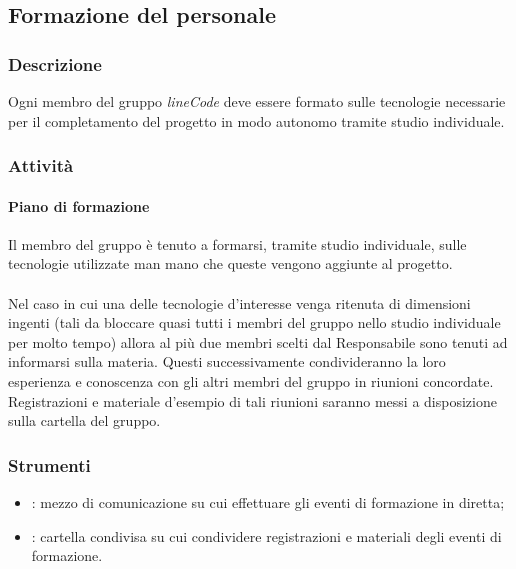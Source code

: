 \subsection{Formazione del personale}

	\subsubsection{Descrizione}
	Ogni membro del gruppo \textit{lineCode} deve essere formato sulle tecnologie necessarie per il completamento del progetto in modo autonomo tramite studio individuale.

    \subsubsection{Attività}
        \paragraph{Piano di formazione}
        Il membro del gruppo è tenuto a formarsi, tramite studio individuale, sulle tecnologie utilizzate man mano che queste vengono aggiunte al progetto.
        \\\\
        Nel caso in cui una delle tecnologie d'interesse venga ritenuta di dimensioni ingenti (tali da bloccare quasi tutti i membri del gruppo nello studio individuale per molto tempo) allora al più due membri scelti dal Responsabile sono tenuti ad informarsi sulla materia. Questi successivamente condivideranno la loro esperienza e conoscenza con gli altri membri del gruppo in riunioni concordate. Registrazioni e materiale d'esempio di tali riunioni saranno messi a disposizione sulla cartella  del gruppo.

    \subsubsection{Strumenti}
    \begin{itemize}
        \item \textbf{}: mezzo di comunicazione su cui effettuare gli eventi di formazione in diretta;
        \item \textbf{}: cartella condivisa su cui condividere registrazioni e materiali degli eventi di formazione.
    \end{itemize}
